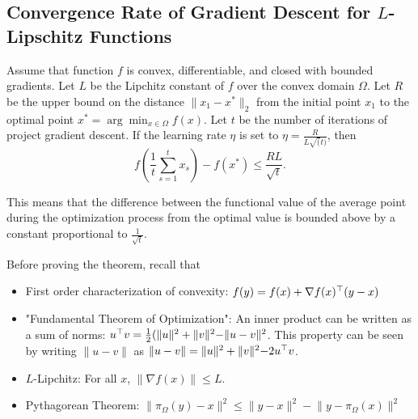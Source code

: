 \subsection{Convergence Rate of Gradient Descent for $L$-Lipschitz Functions}

\begin{theorem}

Assume that function $f$ is convex, differentiable, and closed with bounded
gradients. Let $L$ be the Lipchitz constant of $f$ over the convex domain
$\Omega$. Let $R$ be the upper bound on the distance $\lVert x_1 - x^* \rVert_2$
from the initial point $x_1$ to the optimal point $x^* = \arg\min_{x \in \Omega} f(x)$.
Let $t$ be the number of iterations of project gradient descent.
If the learning rate $\eta$ is set to $\eta=\frac{R}{L \sqrt(t)}$,
then $$f\left(\frac{1}{t}\sum_{s=1}^t x_s\right) - f\left(x^*\right) \leq
\frac{RL}{\sqrt{t}}.$$
\end{theorem}

This means that the difference between the functional value of the average
point during the optimization process from the optimal value is bounded above
by a constant proportional to $\frac{1}{\sqrt{t}}$.

Before proving the theorem, recall that
\begin{itemize}

    \item First order characterization of convexity: $f(y) = f(x) + \nabla
    f(x)^\top (y - x)$

    \item "Fundamental Theorem of Optimization": An inner product can be
    written as a sum of norms: $u^\top v = \frac{1}{2}(\lVert u \rVert^2 +
    \lVert v \lVert^2 - \lVert u - v \rVert^2$. This property can be seen by
    writing $\lVert u - v \rVert$ as $\lVert u - v \rVert = \lVert u \rVert^2 +
    \lVert v \lVert^2 - 2 u^\top v$.

    \item $L$-Lipchitz: For all $x$, $\lVert \nabla f(x) \rVert \leq L$.

    \item Pythagorean Theorem: $\lVert \pi_\Omega (y) - x \rVert^2 \leq \lVert
    y - x \rVert^2 - \lVert y - \pi_\Omega (x) \rVert^2$

\end{itemize}

